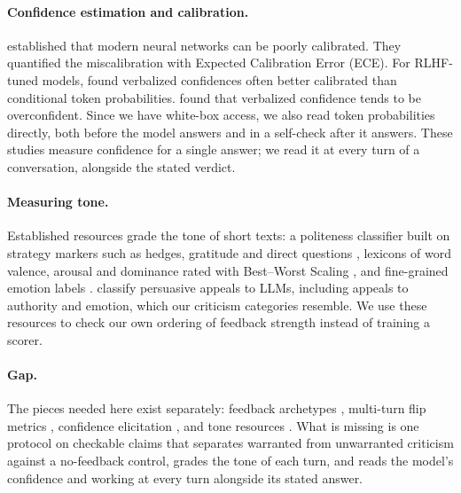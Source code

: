 \paragraph{Confidence estimation and calibration.}
\citet{guo2017calibration} established that modern neural networks can be poorly calibrated.
They quantified the miscalibration with Expected Calibration Error (ECE).
For RLHF-tuned models, \citet{tian-etal-2023-just} found verbalized confidences often better calibrated than conditional token probabilities.
\citet{xiong2023express} found that verbalized confidence tends to be overconfident.
Since we have white-box access, we also read token probabilities directly, both before the model answers and in a self-check after it answers.
These studies measure confidence for a single answer; we read it at every turn of a conversation, alongside the stated verdict.

\paragraph{Measuring tone.}
Established resources grade the tone of short texts: a politeness classifier built on strategy markers such as hedges, gratitude and direct questions \citep{danescu-niculescu-mizil-etal-2013-computational}, lexicons of word valence, arousal and dominance rated with Best--Worst Scaling \citep{mohammad-2018-obtaining, kiritchenko-mohammad-2017-best}, and fine-grained emotion labels \citep{demszky-etal-2020-goemotions}.
\citet{zeng-etal-2024-johnny} classify persuasive appeals to LLMs, including appeals to authority and emotion, which our criticism categories resemble.
We use these resources to check our own ordering of feedback strength instead of training a scorer.

\paragraph{Gap.}
The pieces needed here exist separately: feedback archetypes \citep{sharma2024towards}, multi-turn flip metrics \citep{hong-etal-2025-measuring}, confidence elicitation \citep{tian-etal-2023-just, xiong2023express}, and tone resources \citep{danescu-niculescu-mizil-etal-2013-computational, mohammad-2018-obtaining, demszky-etal-2020-goemotions}.
What is missing is one protocol on checkable claims that separates warranted from unwarranted criticism against a no-feedback control, grades the tone of each turn, and reads the model's confidence and working at every turn alongside its stated answer.
